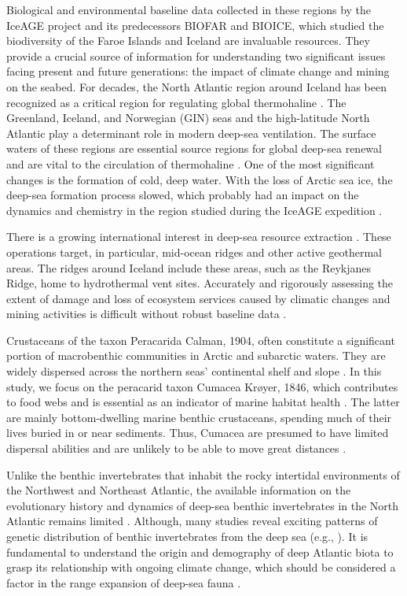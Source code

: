 Biological and environmental baseline data collected in these regions by the IceAGE project and its predecessors BIOFAR and BIOICE, which studied the biodiversity of the Faroe Islands and Iceland are invaluable resources. They provide a crucial source of information for understanding two significant issues facing present and future generations: the impact of climate change and mining on the seabed. For decades, the North Atlantic region around Iceland has been recognized as a critical region for regulating global thermohaline \citep{meisner_prefacebiodiversity_2018}. The Greenland, Iceland, and Norwegian (GIN) seas and the high-latitude North Atlantic play a determinant role in modern deep-sea ventilation. The surface waters of these regions are essential source regions for global deep-sea renewal and are vital to the circulation of thermohaline \citep{johannessen_relationship_1994}. One of the most significant changes is the formation of cold, deep water. With the loss of Arctic sea ice, the deep-sea formation process slowed, which probably had an impact on the dynamics and chemistry in the region studied during the IceAGE expedition \citep{meisner_prefacebiodiversity_2018}.

There is a growing international interest in deep-sea resource extraction \citep{mengerink_call_2014}. These operations target, in particular, mid-ocean ridges and other active geothermal areas. The ridges around Iceland include these areas, such as the Reykjanes Ridge, home to hydrothermal vent sites. Accurately and rigorously assessing the extent of damage and loss of ecosystem services caused by climatic changes and mining activities is difficult without robust baseline data \citep{meisner_prefacebiodiversity_2018}.

Crustaceans of the taxon Peracarida Calman, 1904, often constitute a significant portion of macrobenthic communities in Arctic and subarctic waters. They are widely dispersed across the northern seas’ continental shelf and slope \citep{stransky_diversity_2010}. In this study, we focus on the peracarid taxon Cumacea Krøyer, 1846, which contributes to food webs and is essential as an indicator of marine habitat health \citep{stransky_diversity_2010}. The latter are mainly bottom-dwelling marine benthic crustaceans, spending much of their lives buried in or near sediments. Thus, Cumacea are presumed to have limited dispersal abilities and are unlikely to be able to move great distances \citep{uhlir_adding_2021}.

Unlike the benthic invertebrates that inhabit the rocky intertidal environments of the Northwest and Northeast Atlantic, the available information on the evolutionary history and dynamics of deep-sea benthic invertebrates in the North Atlantic remains limited \citep{jennings_phylogeographic_2014}. Although, many studies reveal exciting patterns of genetic distribution of benthic invertebrates from the deep sea (e.g., \citep{wilson_historical_1998,havermans_genetic_2013}). It is fundamental to understand the origin and demography of deep Atlantic biota to grasp its relationship with ongoing climate change, which should be considered a factor in the range expansion of deep-sea fauna \citep{jennings_phylogeographic_2014}.

